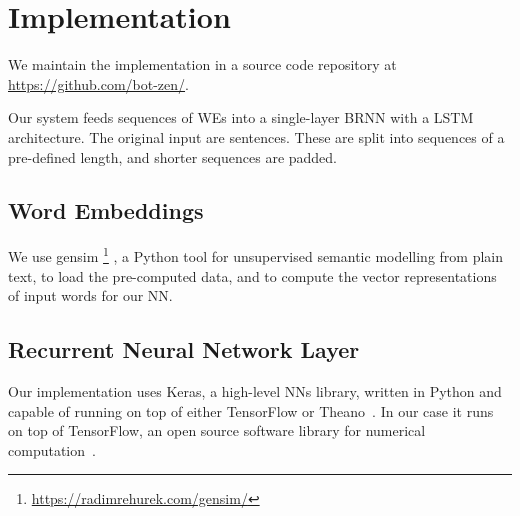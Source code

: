 \documentclass[11pt,a4paper]{article}
\begin{document}
\section{Implementation} %
\label{sec:implementation}

We maintain the implementation in a source code repository at
\url{https://github.com/bot-zen/}.  

Our system feeds sequences of WEs into a single-layer BRNN with a LSTM architecture. The original input are sentences. These are split into sequences of a pre-defined length, and shorter sequences are padded.


\subsection{Word Embeddings} %


We use gensim%
\footnote{\url{https://radimrehurek.com/gensim/}}%
, a Python tool for unsupervised semantic modelling from plain text, to load
the pre-computed data, and to compute the vector representations of
input words for our NN.

\subsection{Recurrent Neural Network Layer} %

Our implementation uses Keras, a high-level NNs library, written in Python and
capable of running on top of either TensorFlow or Theano~\cite{chollet2015}. 
In our case it runs on top of TensorFlow, an open source software library for numerical computation~\cite{tensorflow2015-whitepaper}.
\end{document}
